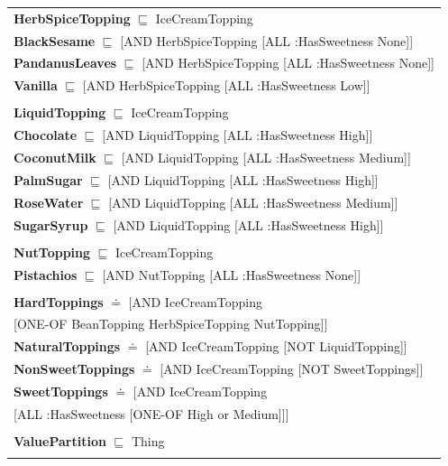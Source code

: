 \documentclass[12pt]{article}
\newcommand*{\MyIndent}{\hspace*{7em}}
\begin{document}
\begin{tabularx}{1\textwidth}{@{}X@{}}
            \textbf{HerbSpiceTopping} $\sqsubseteq$ IceCreamTopping \\
                \textbf{BlackSesame} $\sqsubseteq$ [AND HerbSpiceTopping [ALL :HasSweetness None]] \\
                \textbf{PandanusLeaves} $\sqsubseteq$ [AND HerbSpiceTopping [ALL :HasSweetness None]] \\
                \textbf{Vanilla} $\sqsubseteq$ [AND HerbSpiceTopping [ALL :HasSweetness Low]] \\ \tabularnewline
            
            \textbf{LiquidTopping} $\sqsubseteq$ IceCreamTopping \\            
                \textbf{Chocolate} $\sqsubseteq$ [AND LiquidTopping [ALL :HasSweetness High]] \\
                \textbf{CoconutMilk} $\sqsubseteq$ [AND LiquidTopping [ALL :HasSweetness Medium]] \\
                \textbf{PalmSugar} $\sqsubseteq$ [AND LiquidTopping [ALL :HasSweetness High]] \\
                \textbf{RoseWater} $\sqsubseteq$ [AND LiquidTopping [ALL :HasSweetness Medium]] \\
                \textbf{SugarSyrup} $\sqsubseteq$ [AND LiquidTopping [ALL :HasSweetness High]] \\ \tabularnewline
            
            \textbf{NutTopping} $\sqsubseteq$ IceCreamTopping \\
                \textbf{Pistachios} $\sqsubseteq$ [AND NutTopping [ALL :HasSweetness None]] \\ \tabularnewline
            
            \textbf{HardToppings} $\doteq$ [AND IceCreamTopping \\
                                      \MyIndent [ONE-OF BeanTopping HerbSpiceTopping NutTopping]] \\
            \textbf{NaturalToppings} $\doteq$ [AND IceCreamTopping [NOT LiquidTopping]] \\
            \textbf{NonSweetToppings} $\doteq$ [AND IceCreamTopping [NOT SweetToppings]] \\
            \textbf{SweetToppings} $\doteq$ [AND IceCreamTopping \\ \MyIndent [ALL :HasSweetness [ONE-OF High or Medium]]] \\\tabularnewline


            \textbf{ValuePartition} $\sqsubseteq$ Thing \\ \tabularnewline
            

\end{tabularx}
\end{document}
